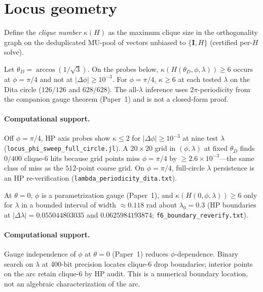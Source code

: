 
\section{Locus geometry}
\label{sec:proof-locus}

Define the \emph{clique number} $\kappa(H)$ as the maximum clique size in the orthogonality graph on the
deduplicated MU-pool of vectors unbiased to $\{\mathbf{I},H\}$ (certified per-$H$ solve).

\begin{finding}
\label{prop:L5}
Let $\theta_D=\arccos(1/\sqrt3)$.
On the probes below, $\kappa(H(\theta_D,\phi,\lambda))\ge6$ occurs at $\phi=\pi/4$ and not at $|\Delta\phi|\ge10^{-3}$.
For $\phi=\pi/4$, $\kappa\ge6$ at each tested $\lambda$ on the Dita circle ($126/126$ and $628/628$).
The all-$\lambda$ inference uses $2\pi$-periodicity from the companion gauge theorem (Paper~1) and is not a closed-form proof.
\end{finding}

\paragraph{Computational support.}
Off $\phi=\pi/4$, HP axis probes show $\kappa\le2$ for $|\Delta\phi|\ge10^{-3}$ at nine test $\lambda$
(\texttt{locus\_phi\_sweep\_full\_circle.jl}).
A $20\times20$ grid in $(\phi,\lambda)$ at fixed $\theta_D$ finds $0/400$ clique-6 hits because grid points miss $\phi=\pi/4$ by $\ge2.6\times10^{-3}$---the same class of miss as the $512$-point coarse grid.
On $\phi=\pi/4$, full-circle $\lambda$ persistence is an HP re-verification (\texttt{lambda\_periodicity\_dita.txt}).

\begin{finding}[Bounded $\lambda$-arc at $\theta=0$ (HP)]
\label{prop:L6}
At $\theta=0$, $\phi$ is a parametrization gauge (Paper~1), and $\kappa(H(0,\phi,\lambda))\ge6$ only for
$\lambda$ in a bounded interval of width $\approx0.118$ rad about $\lambda_0=0.3$
(HP boundaries at $|{\Delta\lambda}|=0.055044803035$ and $0.0625984193874$; \texttt{f6\_boundary\_reverify.txt}).
\end{finding}

\paragraph{Computational support.}
Gauge independence of $\phi$ at $\theta=0$ (Paper~1) reduces $\phi$-dependence.
Binary search on $\lambda$ at 400-bit precision locates clique-6 drop boundaries; interior points on the arc retain clique-6 by HP audit.
This is a numerical boundary location, not an algebraic characterization of the arc.
